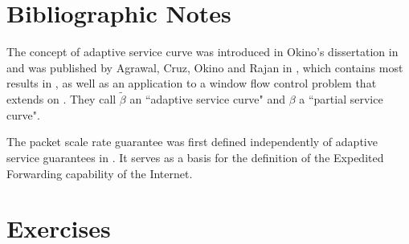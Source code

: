 \section{Bibliographic Notes}

The concept of adaptive service curve was introduced in Okino's
dissertation in \cite{oki98} and was published by Agrawal, Cruz,
Okino and Rajan in \cite{cruzADAP}, which contains most results in
, as well as an application to a window flow
control problem that extends  on
. They call $\tilde{\beta}$ an
``adaptive service curve" and $\beta$ a ``partial service curve".

The packet scale rate guarantee was first defined
independently of adaptive service guarantees in
\cite{lebinfocom2001}. It serves as a basis for the definition
of the Expedited Forwarding capability of the Internet.

\section{Exercises}


